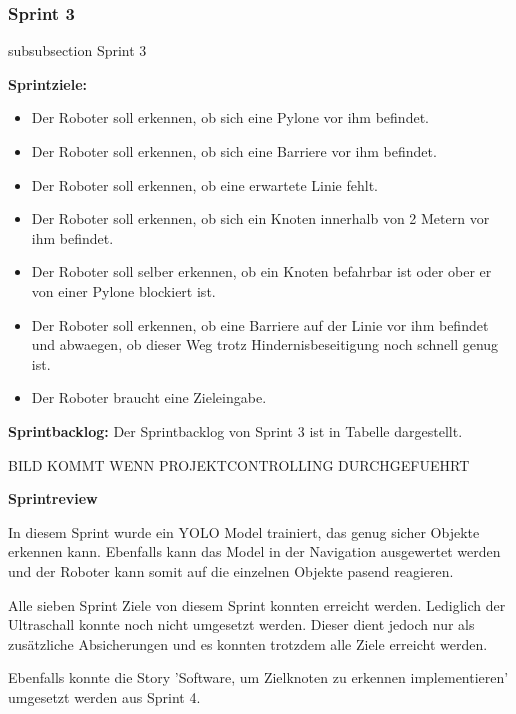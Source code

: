 \subsubsection*{Sprint 3}
    {subsubsection}
    {Sprint 3}

\textbf{Sprintziele:}
\begin{itemize}
    \item Der Roboter soll erkennen, ob sich eine Pylone vor ihm befindet.
    \item Der Roboter soll erkennen, ob sich eine Barriere vor ihm befindet.
    \item Der Roboter soll erkennen, ob eine erwartete Linie fehlt.
    \item Der Roboter soll erkennen, ob sich ein Knoten innerhalb von 2 Metern vor ihm befindet.
    \item Der Roboter soll selber erkennen, ob ein Knoten befahrbar ist oder ober er von einer Pylone blockiert ist.
    \item Der Roboter soll erkennen, ob eine Barriere auf der Linie vor ihm befindet und abwaegen, ob dieser Weg trotz Hindernisbeseitigung noch schnell genug ist.
    \item Der Roboter braucht eine Zieleingabe.

\end{itemize}

\textbf{Sprintbacklog:} Der Sprintbacklog von Sprint 3 ist in Tabelle 
dargestellt.

BILD KOMMT WENN PROJEKTCONTROLLING DURCHGEFUEHRT



\textbf{Sprintreview}

In diesem Sprint wurde ein YOLO Model trainiert, das genug sicher Objekte erkennen kann. Ebenfalls kann das Model in der Navigation ausgewertet werden und der Roboter kann somit auf die einzelnen Objekte pasend reagieren. 

Alle sieben Sprint Ziele von diesem Sprint konnten erreicht werden. Lediglich der Ultraschall konnte noch nicht umgesetzt werden. Dieser dient jedoch nur als zusätzliche Absicherungen und es konnten trotzdem alle Ziele erreicht werden.

Ebenfalls konnte die Story 'Software, um Zielknoten zu erkennen implementieren' umgesetzt werden aus Sprint 4.

